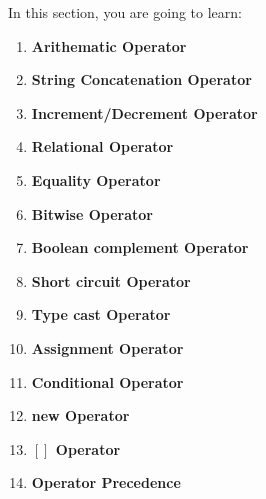 \setlength{\columnsep}{3pt}
\begin{flushleft}
	\bigskip
	\bigskip
	\begin{tcolorbox}[breakable,notitle,boxrule=1pt,colback=black,colframe=black]
		\color{white}
		\bigskip
		In this section, you are going to learn:
		\begin{enumerate}
			\item \textbf{Arithematic Operator}
			\item \textbf{String Concatenation Operator}
			\item \textbf{Increment/Decrement Operator}
			\item \textbf{Relational Operator}
			\item \textbf{Equality Operator}
			\item \textbf{Bitwise Operator}
			\item \textbf{Boolean complement Operator}
			\item \textbf{Short circuit Operator}
			\item \textbf{Type cast Operator}
			\item \textbf{Assignment Operator}
			\item \textbf{Conditional Operator}
			\item \textbf{new Operator}
			\item \textbf{ $\left[ \right]$ Operator}
			\item \textbf{Operator Precedence}
		\end{enumerate}	
	
	\end{tcolorbox}
	
\end{flushleft}

\newpage

